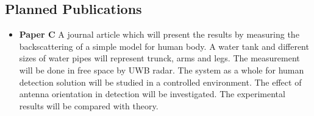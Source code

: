 \subsection{Planned Publications}
\begin{itemize} 
	\item \textbf{Paper C} A journal article which will present the results by measuring the backscattering of a simple model for human body. A water tank and different sizes of water pipes will represent trunck, arms and legs. The measurement will be done in free space by UWB radar. The system as a whole for human detection solution will be studied in a controlled environment. The effect of antenna orientation in detection will be investigated. The experimental results will be compared with theory.  
\end{itemize}
 